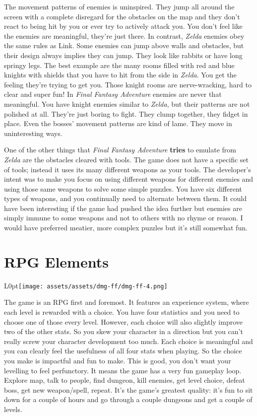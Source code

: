 \documentclass{book}
\begin{document}
The movement patterns of enemies is uninspired. They jump all around the screen with a complete disregard for the obstacles on the map and they don’t react to being hit by you or ever try to actively attack you. You don’t feel like the enemies are meaningful, they’re just there. In contrast, \emph{Zelda} enemies obey the same rules as Link. Some enemies can jump above walls and obstacles, but their design always implies they can jump. They look like rabbits or have long springy legs. The best example are the many rooms filled with red and blue knights with shields that you have to hit from the side in \emph{Zelda}. You get the feeling they’re trying to get you. Those knight rooms are nerve-wracking, hard to clear and super fun! In \emph{Final Fantasy Adventure} enemies are never that meaningful. You have knight enemies similar to \emph{Zelda}, but their patterns are not polished at all. They’re just boring to fight. They clump together, they fidget in place. Even the bosses’ movement patterns are kind of lame. They move in uninteresting ways.\par
One of the other things that \emph{Final Fantasy Adventure} \textbf{tries} to emulate from \emph{Zelda} are the obstacles cleared with tools. The game does not have a specific set of tools; instead it uses its many different weapons as your tools. The developer’s intent was to make you focus on using different weapons for different enemies and using those same weapons to solve some simple puzzles. You have six different types of weapons, and you continually need to alternate between them. It could have been interesting if the game had pushed the idea further but enemies are simply immune to some weapons and not to others with no rhyme or reason. I would have preferred meatier, more complex puzzles but it’s still somewhat fun.\par
\FloatBarrier\section*{RPG Elements}
\begin{wrapfigure}{L}{0pt}{\texttt{[image: assets/assets/dmg-ff/dmg-ff-4.png]}}\end{wrapfigure}\noindent
The game is an RPG first and foremost. It features an experience system, where each level is rewarded with a choice. You have four statistics and you need to choose one of those every level. However, each choice will also slightly improve two of the other stats. So you skew your character in a direction but you can’t really screw your character development too much. Each choice is meaningful and you can clearly feel the usefulness of all four stats when playing. So the choice you make is impactful and fun to make. This is good, you don’t want your levelling to feel perfunctory. It means the game has a very fun gameplay loop. Explore map, talk to people, find dungeon, kill enemies, get level choice, defeat boss, get new weapon/spell, repeat. It’s the game’s greatest quality: it’s fun to sit down for a couple of hours and go through a couple dungeons and get a couple of levels.\par
\end{document}
